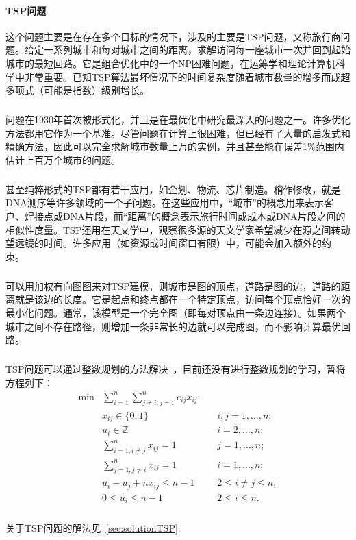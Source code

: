 \documentclass[UTF8,a4paper]{ctexart}
\begin{document}
\paragraph{TSP问题}这个问题主要是在存在多个目标的情况下，涉及的主要是TSP问题，又称旅行商问题。给定一系列城市和每对城市之间的距离，求解访问每一座城市一次并回到起始城市的最短回路。它是组合优化中的一个NP困难问题，在运筹学和理论计算机科学中非常重要。已知TSP算法最坏情况下的时间复杂度随着城市数量的增多而成超多项式（可能是指数）级别增长。
\subparagraph{}问题在1930年首次被形式化，并且是在最优化中研究最深入的问题之一。许多优化方法都用它作为一个基准。尽管问题在计算上很困难，但已经有了大量的启发式和精确方法，因此可以完全求解城市数量上万的实例，并且甚至能在误差1\%范围内估计上百万个城市的问题。
\subparagraph{}甚至纯粹形式的TSP都有若干应用，如企划、物流、芯片制造。稍作修改，就是DNA测序等许多领域的一个子问题。在这些应用中，“城市”的概念用来表示客户、焊接点或DNA片段，而“距离”的概念表示旅行时间或成本或DNA片段之间的相似性度量。TSP还用在天文学中，观察很多源的天文学家希望减少在源之间转动望远镜的时间。许多应用（如资源或时间窗口有限）中，可能会加入额外的约束。~\cite{worldtsp}
\subparagraph{}可以用加权有向图图来对TSP建模，则城市是图的顶点，道路是图的边，道路的距离就是该边的长度。它是起点和终点都在一个特定顶点，访问每个顶点恰好一次的最小化问题。通常，该模型是一个完全图（即每对顶点由一条边连接）。如果两个城市之间不存在路径，则增加一条非常长的边就可以完成图，而不影响计算最优回路。
\subparagraph{}TSP问题可以通过整数规划的方法解决~\cite{papadimi}，目前还没有进行整数规划的学习，暂将方程列下：
\begin{align}
    \min & \sum _{i=1}^{n}\sum _{j\neq i,j=1}^{n}c_{ij}x_{ij}\colon &  &                      \\
         & x_{ij}\in \{0,1\}                                        &  & i,j=1,\ldots ,n;     \\
         & u_{i}\in  \mathbb{Z}                                     &  & i=2,\ldots ,n;       \\
         & \sum _{i=1,i\neq j}^{n}x_{ij}=1                          &  & j=1,\ldots ,n;       \\
         & \sum _{j=1,j\neq i}^{n}x_{ij}=1                          &  & i=1,\ldots ,n;       \\
         & u_{i}-u_{j}+nx_{ij}\leq n-1                              &  & 2\leq i\neq j\leq n; \\
         & 0\leq u_{i}\leq n-1                                      &  & 2\leq i\leq n.
\end{align}
\subparagraph{}关于TSP问题的解法见~\ref{sec:solutionTSP}.
\end{document}
